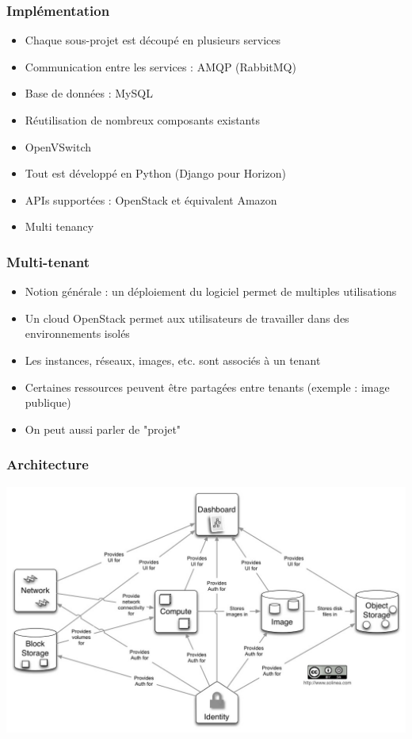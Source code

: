   \begin{frame}
    \frametitle{Implémentation}
    \begin{itemize}
      \item Chaque sous-projet est découpé en plusieurs services\pause
      \item Communication entre les services : AMQP (RabbitMQ)\pause
      \item Base de données : MySQL\pause
      \item Réutilisation de nombreux composants existants\pause
      \item OpenVSwitch\pause
      \item Tout est développé en Python (Django pour Horizon)\pause
      \item APIs supportées : OpenStack et équivalent Amazon\pause
      \item Multi tenancy
    \end{itemize}
  \end{frame}

  \begin{frame}
    \frametitle{Multi-tenant}
    \begin{itemize}
      \item Notion générale : un déploiement du logiciel permet de multiples utilisations
      \item Un cloud OpenStack permet aux utilisateurs de travailler dans des environnements isolés
      \item Les instances, réseaux, images, etc. sont associés à un tenant
      \item Certaines ressources peuvent être partagées entre tenants (exemple : image publique)
      \item On peut aussi parler de "projet"
    \end{itemize}
  \end{frame}

  \begin{frame}
    \frametitle{Architecture}
    \begin{center}
      \includegraphics[width=\textwidth]{images/architecture-simple.jpg}
    \end{center}
  \end{frame}

